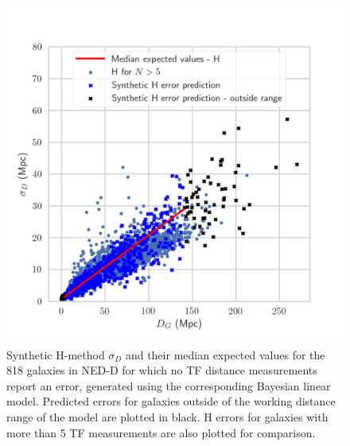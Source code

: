 \documentclass[a4paper,fleqn,usenatbib]{mnras}
\begin{document}
\begin{figure}
	\includegraphics[scale=0.7]{predl1.png}
    \caption{Synthetic H-method $\sigma_D$ and their median expected values for the 818 galaxies in NED-D for which no TF distance measurements report an error, generated using the corresponding Bayesian linear model. Predicted errors for galaxies outside of the working distance range of the model are plotted in black. H errors for galaxies with more than 5 TF measurements are also plotted for comparison.}
    \label{fig:predl1}
\end{figure}
\end{document}
